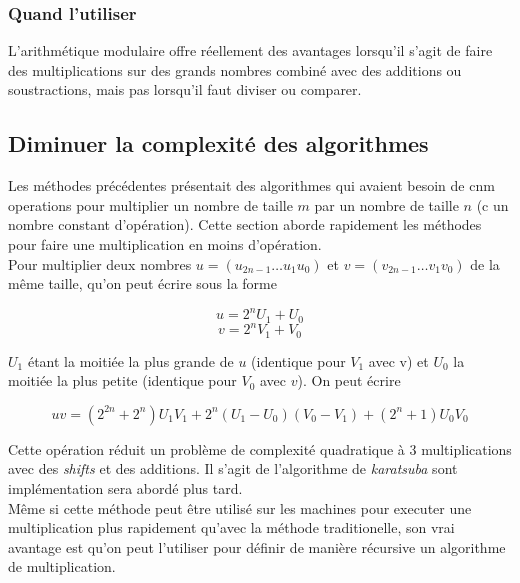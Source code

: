 \documentclass[letterpaper]{article}
\begin{document}

\subsubsection{Quand l'utiliser}

L'arithmétique modulaire offre réellement des avantages lorsqu'il s'agit de faire
des multiplications sur des grands nombres combiné avec des additions ou
soustractions, mais pas lorsqu'il faut diviser ou comparer.

\subsection{Diminuer la complexité des algorithmes}

Les méthodes précédentes présentait des algorithmes qui avaient besoin de cnm operations pour multiplier un nombre de taille
$m$ par un nombre de taille $n$ (c un nombre constant d'opération). Cette section aborde rapidement les méthodes pour faire
une multiplication en moins d'opération. \\

Pour multiplier deux nombres $u = (u_{2n-1} \dots u_1 u_0)$ et $v = (v_{2n-1} \dots v_1 v_0)$ de la même taille, qu'on peut
écrire sous la forme

  $$u = 2^{n} U_1 + U_0$$
  $$v = 2^{n} V_1 + V_0$$

$U_1$ étant la moitiée la plus grande de $u$ (identique pour $V_1$ avec v) et $U_0$ la moitiée la plus petite (identique pour
$V_0$ avec $v$). On peut écrire

  $$uv = (2^{2n} + 2^n) U_1 V_1 + 2^n (U_1 - U_0) (V_0 - V_1) + (2^n + 1) U_0 V_0$$

Cette opération réduit un problème de complexité quadratique à 3 multiplications avec des \emph{shifts} et des additions. Il
s'agit de l'algorithme de \emph{karatsuba} sont implémentation sera abordé plus tard.\\

Même si cette méthode peut être utilisé sur les machines pour executer une
multiplication plus rapidement qu'avec la méthode traditionelle, son vrai
avantage est qu'on peut l'utiliser pour définir de manière récursive un
algorithme de multiplication.

\end{document}
